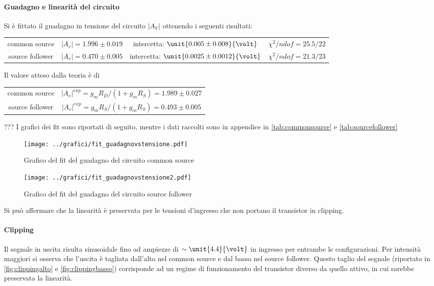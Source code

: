 \documentclass[10pt,a4paper]{article}
\begin{document}
\paragraph{Guadagno e linearità del circuito} Si è fittato il guadagno in tensione del circuito $|A_V|$ ottenendo i seguenti risultati:
\begin{table}[h!]
	\centering
	\begin{tabular}{cccc}
		common source & $|A_v| = 1.996 \pm 0.019$ & intercetta: $\unit{0.005 \pm 0.008}{\volt}$ & $\chi^2 / ndof = 25.5 / 22$\\
		source follower &	$|A_v| = 0.470 \pm 0.005$ & intercetta: $\unit{0.0025 \pm 0.0012}{\volt}$ & $\chi^2 / ndof = 21.3 / 23$
	\end{tabular}
\end{table}

Il valore atteso dalla teoria è di

\begin{table}[h!]
	\centering
	\begin{tabular}{cc}
		common source & $|A_v|^{exp} =g_mR_D/(1+g_mR_S) = 1.989 \pm 0.027$ \\
		source follower &	$|A_v|^{exp} =g_mR_S/(1+g_mR_S) = 0.493 \pm 0.005
		 $
	\end{tabular}
\end{table}

???
I grafici dei fit sono riportati di seguito, mentre i dati raccolti sono in appendice in \tablename{\ref{tab:commonsource}} e \tablename{\ref{tab:sourcefollower}}

\begin{figure}[h!]
	\centering
	\texttt{[image: ../grafici/fit\_guadagnovstensione.pdf]}
	\caption{Grafico del fit del guadagno del circuito common source}
\end{figure}
\begin{figure}[h!]
	\centering
	\texttt{[image: ../grafici/fit\_guadagnovstensione2.pdf]}
	\caption{Grafico del fit del guadagno del circuito source follower}
\end{figure}

 Si può affermare che la linearità è preservata per le tensioni d'ingresso che non portano il transistor in clipping.
  
 \paragraph{Clipping}
Il segnale in uscita risulta sinusoidale fino ad ampiezze di $\sim \unit{4.4}{\volt}$ in ingresso per entrambe le configurazioni.
Per intensità maggiori si osserva che l'uscita è tagliata dall'alto nel common source e dal basso nel source follower. Questo taglio del segnale (riportato in \figurename{\ref{fig:clippingalto}} e \figurename{\ref{fig:clippingbasso}}) corrisponde ad un regime di funzionamento del transistor diverso da quello attivo, in cui sarebbe preservata la linearità.
\end{document}
